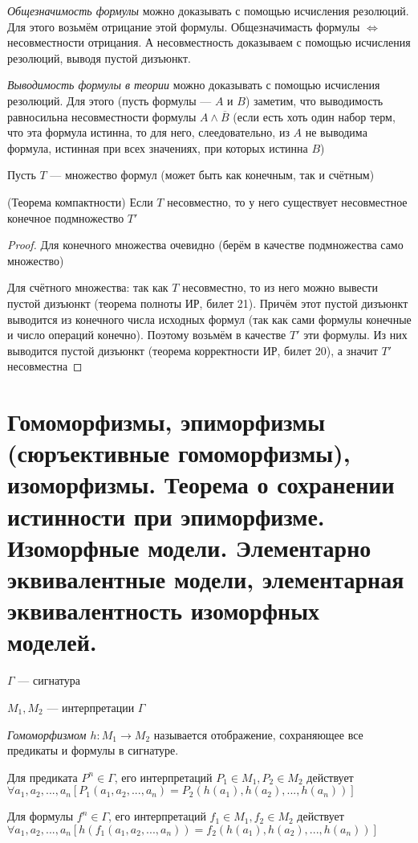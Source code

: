 \documentclass{article}
\begin{document}
\textit{Общезначимость формулы} можно доказывать с помощью исчисления резолюций. Для этого возьмём отрицание этой формулы. Общезначимасть формулы $\Leftrightarrow$ несовместности отрицания. А несовместность доказываем с помощью исчисления резолюций, выводя пустой дизъюнкт.

\textit{Выводимость формулы в теории} можно доказывать с помощью исчисления резолюций. Для этого (пусть формулы --- $A$ и $B$) заметим, что выводимость равносильна несовместности формулы $A \wedge \overline{B}$ (если есть хоть один набор терм, что эта формула истинна, то для него, слеедовательно, из $A$ не выводима формула, истинная при всех значениях, при которых истинна $B$)

Пусть $T$ --- множество формул (может быть как конечным, так и счётным)
\begin{theorem}{(Теорема компактности)}
	Если $T$ несовместно, то у него существует несовместное конечное подмножество $T'$
\end{theorem}

\begin{proof}
    Для конечного множества очевидно (берём в качестве подмножества само множество)
	
	Для счётного множества: так как $T$ несовместно, то из него можно вывести пустой дизъюнкт (теорема полноты ИР, билет 21). Причём этот пустой дизъюнкт выводится из конечного числа исходных формул (так как сами формулы конечные и число операций конечно). Поэтому возьмём в качестве $T'$ эти формулы. Из них выводится пустой дизъюнкт (теорема корректности ИР, билет 20), а значит $T'$ несовместна
\end{proof}

\section{Гомоморфизмы, эпиморфизмы (сюръективные гомоморфизмы), изоморфизмы. Теорема о сохранении истинности при эпиморфизме. Изоморфные модели. Элементарно эквивалентные модели, элементарная эквивалентность изоморфных моделей.}
$\Gamma$ --- сигнатура

$M_1, M_2$ --- интерпретации $\Gamma$
\begin{definition}
	\textit{Гомоморфизмом $h: M_1 \rightarrow M_2$} называется отображение, сохраняющее все предикаты и формулы в сигнатуре. 
	
	Для предиката $P^n \in \Gamma$, его интерпретаций $P_1 \in M_1, P_2 \in M_2$ действует \\
	$\forall a_1, a_2,..., a_n[P_1(a_1, a_2,..., a_n) = P_2(h(a_1), h(a_2),..., h(a_n))]$
	
	Для формулы $f^n \in \Gamma$, его интерпретаций $f_1 \in M_1, f_2 \in M_2$ действует \\
	$\forall a_1, a_2,..., a_n[h(f_1(a_1, a_2,..., a_n)) = f_2(h(a_1), h(a_2),..., h(a_n))]$
\end{definition}
\end{document}
